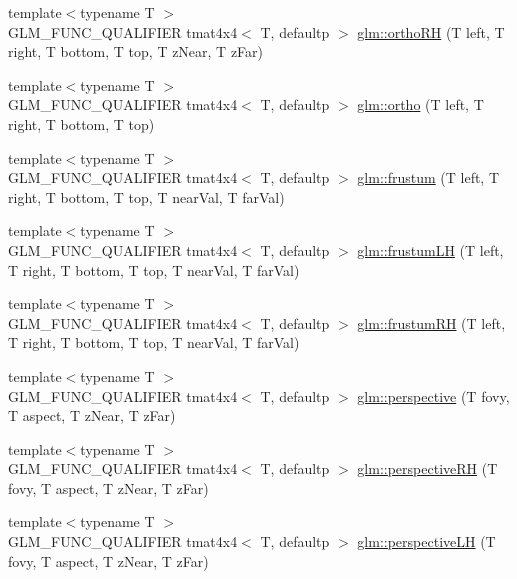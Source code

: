 \begin{DoxyCompactItemize}
\item 
{\footnotesize template$<$typename T $>$ }\\G\+L\+M\+\_\+\+F\+U\+N\+C\+\_\+\+Q\+U\+A\+L\+I\+F\+I\+ER tmat4x4$<$ T, defaultp $>$ \hyperlink{group__gtc__matrix__transform_gada0aaaee76f1fd3c272698c8eca735a1}{glm\+::ortho\+RH} (T left, T right, T bottom, T top, T z\+Near, T z\+Far)
\item 
{\footnotesize template$<$typename T $>$ }\\G\+L\+M\+\_\+\+F\+U\+N\+C\+\_\+\+Q\+U\+A\+L\+I\+F\+I\+ER tmat4x4$<$ T, defaultp $>$ \hyperlink{group__gtc__matrix__transform_ga45b1b64f99255c07119b4f1aaed04dd7}{glm\+::ortho} (T left, T right, T bottom, T top)
\item 
{\footnotesize template$<$typename T $>$ }\\G\+L\+M\+\_\+\+F\+U\+N\+C\+\_\+\+Q\+U\+A\+L\+I\+F\+I\+ER tmat4x4$<$ T, defaultp $>$ \hyperlink{group__gtc__matrix__transform_gada6deb989d4b553fe0f7e3279f3afae1}{glm\+::frustum} (T left, T right, T bottom, T top, T near\+Val, T far\+Val)
\item 
{\footnotesize template$<$typename T $>$ }\\G\+L\+M\+\_\+\+F\+U\+N\+C\+\_\+\+Q\+U\+A\+L\+I\+F\+I\+ER tmat4x4$<$ T, defaultp $>$ \hyperlink{group__gtc__matrix__transform_ga75b1c1d0ee1f80c1e873605adeb1838c}{glm\+::frustum\+LH} (T left, T right, T bottom, T top, T near\+Val, T far\+Val)
\item 
{\footnotesize template$<$typename T $>$ }\\G\+L\+M\+\_\+\+F\+U\+N\+C\+\_\+\+Q\+U\+A\+L\+I\+F\+I\+ER tmat4x4$<$ T, defaultp $>$ \hyperlink{group__gtc__matrix__transform_gad0e184273bdacbe769e5cd81069e48ed}{glm\+::frustum\+RH} (T left, T right, T bottom, T top, T near\+Val, T far\+Val)
\item 
{\footnotesize template$<$typename T $>$ }\\G\+L\+M\+\_\+\+F\+U\+N\+C\+\_\+\+Q\+U\+A\+L\+I\+F\+I\+ER tmat4x4$<$ T, defaultp $>$ \hyperlink{group__gtc__matrix__transform_gac3613dcb6c6916465ad5b7ad5a786175}{glm\+::perspective} (T fovy, T aspect, T z\+Near, T z\+Far)
\item 
{\footnotesize template$<$typename T $>$ }\\G\+L\+M\+\_\+\+F\+U\+N\+C\+\_\+\+Q\+U\+A\+L\+I\+F\+I\+ER tmat4x4$<$ T, defaultp $>$ \hyperlink{group__gtc__matrix__transform_ga5a4fa9f8ffabb2294e48a18bf8fa2f5f}{glm\+::perspective\+RH} (T fovy, T aspect, T z\+Near, T z\+Far)
\item 
{\footnotesize template$<$typename T $>$ }\\G\+L\+M\+\_\+\+F\+U\+N\+C\+\_\+\+Q\+U\+A\+L\+I\+F\+I\+ER tmat4x4$<$ T, defaultp $>$ \hyperlink{group__gtc__matrix__transform_ga34048da27c559f1ac8e9550d169dd6f3}{glm\+::perspective\+LH} (T fovy, T aspect, T z\+Near, T z\+Far)

\end{DoxyCompactItemize}
